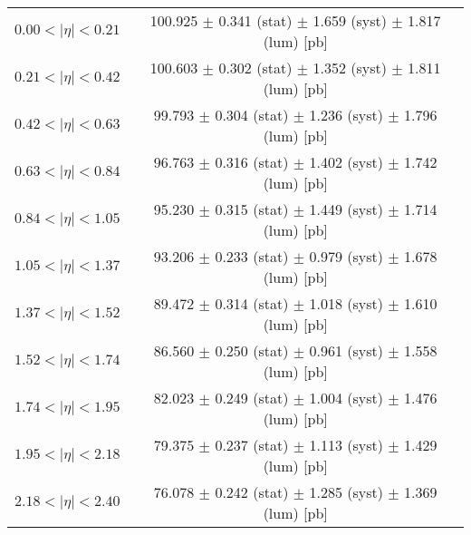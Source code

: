 \begin{tabular}{lc}
\hline
$0.00 < |\eta| <0.21$          & 100.925 $\pm$ 0.341 (stat) $\pm$ 1.659 (syst) $\pm$ 1.817 (lum) [pb]  \\
$0.21 < |\eta| <0.42$          & 100.603 $\pm$ 0.302 (stat) $\pm$ 1.352 (syst) $\pm$ 1.811 (lum) [pb]  \\
$0.42 < |\eta| <0.63$          & 99.793 $\pm$ 0.304 (stat) $\pm$ 1.236 (syst) $\pm$ 1.796 (lum) [pb]  \\
$0.63 < |\eta| <0.84$          & 96.763 $\pm$ 0.316 (stat) $\pm$ 1.402 (syst) $\pm$ 1.742 (lum) [pb]  \\
$0.84 < |\eta| <1.05$          & 95.230 $\pm$ 0.315 (stat) $\pm$ 1.449 (syst) $\pm$ 1.714 (lum) [pb]  \\
$1.05 < |\eta| <1.37$          & 93.206 $\pm$ 0.233 (stat) $\pm$ 0.979 (syst) $\pm$ 1.678 (lum) [pb]  \\
$1.37 < |\eta| <1.52$          & 89.472 $\pm$ 0.314 (stat) $\pm$ 1.018 (syst) $\pm$ 1.610 (lum) [pb]  \\
$1.52 < |\eta| <1.74$          & 86.560 $\pm$ 0.250 (stat) $\pm$ 0.961 (syst) $\pm$ 1.558 (lum) [pb]  \\
$1.74 < |\eta| <1.95$          & 82.023 $\pm$ 0.249 (stat) $\pm$ 1.004 (syst) $\pm$ 1.476 (lum) [pb]  \\
$1.95 < |\eta| <2.18$          & 79.375 $\pm$ 0.237 (stat) $\pm$ 1.113 (syst) $\pm$ 1.429 (lum) [pb]  \\
$2.18 < |\eta| <2.40$          & 76.078 $\pm$ 0.242 (stat) $\pm$ 1.285 (syst) $\pm$ 1.369 (lum) [pb]  \\
\hline
\end{tabular}
